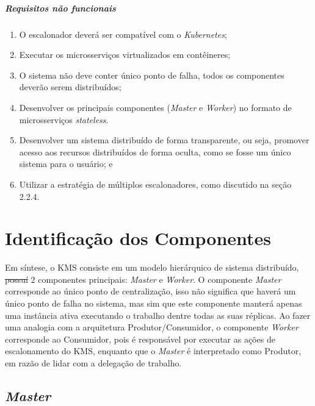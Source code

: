 \documentclass[
	12pt,				%
	openright,			%
	oneside,			%
	a4paper,			%
	brazil				%
	]{abntex2}
\providecommand{\DIFaddtex}[1]{{\protect\color{blue}\uwave{#1}}} %
\providecommand{\DIFdeltex}[1]{{\protect\color{red}\sout{#1}}}                      %
\providecommand{\DIFaddbegin}{} %
\providecommand{\DIFaddend}{} %
\providecommand{\DIFdelbegin}{} %
\providecommand{\DIFdelend}{} %
\providecommand{\DIFadd}[1]{\texorpdfstring{\DIFaddtex{#1}}{#1}} %
\providecommand{\DIFdel}[1]{\texorpdfstring{\DIFdeltex{#1}}{}} %
\newcommand{\DIFscaledelfig}{0.5}
\newlength{\DIFdelgraphicswidth} %
\newlength{\DIFdelgraphicsheight} %
\newcommand{\DIFaddincludegraphics}[2][]{{\color{blue}\fbox{\DIFOincludegraphics[#1]{#2}}}} %
\newcommand{\DIFdelincludegraphics}[2][]{%
\sbox{\DIFdelgraphicsbox}{\DIFOincludegraphics[#1]{#2}}%
\settoboxwidth{\DIFdelgraphicswidth}{\DIFdelgraphicsbox} %
\settoboxtotalheight{\DIFdelgraphicsheight}{\DIFdelgraphicsbox} %
\scalebox{\DIFscaledelfig}{%
\parbox[b]{\DIFdelgraphicswidth}{\usebox{\DIFdelgraphicsbox}\\[-\baselineskip] \rule{\DIFdelgraphicswidth}{0em}}\llap{\resizebox{\DIFdelgraphicswidth}{\DIFdelgraphicsheight}{%
\setlength{\unitlength}{\DIFdelgraphicswidth}%
\begin{picture}(1,1)%
\thicklines\linethickness{2pt} %
{\color[rgb]{1,0,0}\put(0,0){\framebox(1,1){}}}%
{\color[rgb]{1,0,0}\put(0,0){\line( 1,1){1}}}%
{\color[rgb]{1,0,0}\put(0,1){\line(1,-1){1}}}%
\end{picture}%
}\hspace*{3pt}}} %
} %
\DeclareRobustCommand{\DIFaddbegin}{\DIFOaddbegin \let\includegraphics\DIFaddincludegraphics} %
\DeclareRobustCommand{\DIFaddend}{\DIFOaddend \let\includegraphics\DIFOincludegraphics} %
\DeclareRobustCommand{\DIFdelbegin}{\DIFOdelbegin \let\includegraphics\DIFdelincludegraphics} %
\DeclareRobustCommand{\DIFdelend}{\DIFOaddend \let\includegraphics\DIFOincludegraphics} %
\begin{document}
\subparagraph{Requisitos não funcionais}
\begin{enumerate}
	\item O escalonador deverá ser compatível com o \textit{Kubernetes};
	\item Executar os microsserviços virtualizados em contêineres;
	\item O sistema não deve conter único ponto de falha, todos os componentes deverão serem distribuídos;
	\item Desenvolver os principais componentes (\textit{Master} e \textit{Worker}) no formato de microsserviços \textit{stateless}.
	\item Desenvolver um sistema distribuído de forma transparente, ou seja, promover acesso aos recursos distribuídos de forma oculta, como se fosse um único sistema para o usuário; e
	\item Utilizar a estratégia de múltiplos escalonadores, como discutido na seção 2.2.4.
\end{enumerate}

\section{Identificação dos Componentes}

Em síntese, o \ac{KMS} consiste em um modelo hierárquico de sistema distribuído, \DIFdelbegin \DIFdel{possuí }\DIFdelend \DIFaddbegin \DIFadd{possuindo }\DIFaddend 2 componentes principais: \textit{Master} e \textit{Worker}. O componente \textit{Master} corresponde ao único ponto de centralização, isso não significa que haverá um único ponto de falha no sistema, mas sim que este componente manterá apenas uma instância ativa executando o trabalho dentre todas as suas réplicas. Ao fazer uma analogia com a arquitetura Produtor/Consumidor, o componente \textit{Worker} corresponde ao Consumidor, pois é responsável por executar as ações de escalonamento do \ac{KMS}, enquanto que o \textit{Master} é interpretado como Produtor, em razão de lidar com a delegação de trabalho.



\subsection{\textit{Master}}
\end{document}
